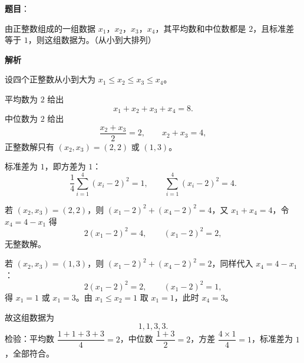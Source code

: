 \begin{answer}

\textbf{题目}：

由正整数组成的一组数据 $x_1$，$x_2$，$x_3$，$x_4$，其平均数和中位数都是 $2$，且标准差等于 $1$，则这组数据为\gkblank{}。（从小到大排列）

\textbf{解析}

设四个正整数从小到大为 $x_1\leqslant x_2\leqslant x_3\leqslant x_4$。

平均数为 $2$ 给出
\nopagebreak[4]
\[x_1+x_2+x_3+x_4=8.\]
中位数为 $2$ 给出
\nopagebreak[4]
\[\frac{x_2+x_3}{2}=2,\qquad x_2+x_3=4,\]
正整数解只有 $(x_2,x_3)=(2,2)$ 或 $(1,3)$。

标准差为 $1$，即方差为 $1$：
\nopagebreak[4]
\[\frac14\sum_{i=1}^{4}(x_i-2)^2=1,\qquad \sum_{i=1}^{4}(x_i-2)^2=4.\]

若 $(x_2,x_3)=(2,2)$，则 $(x_1-2)^2+(x_4-2)^2=4$，又 $x_1+x_4=4$，令 $x_4=4-x_1$ 得
\nopagebreak[4]
\[2(x_1-2)^2=4,\qquad (x_1-2)^2=2,\]
无整数解。

若 $(x_2,x_3)=(1,3)$，则 $(x_1-2)^2+(x_4-2)^2=2$，同样代入 $x_4=4-x_1$：
\nopagebreak[4]
\[2(x_1-2)^2=2,\qquad (x_1-2)^2=1,\]
得 $x_1=1$ 或 $x_1=3$。由 $x_1\leqslant x_2=1$ 取 $x_1=1$，此时 $x_4=3$。

故这组数据为
\nopagebreak[4]
\[1,1,3,3.\]
检验：平均数 $\dfrac{1+1+3+3}{4}=2$，中位数 $\dfrac{1+3}{2}=2$，方差 $\dfrac{4\times1}{4}=1$，标准差为 $1$，全部符合。


\end{answer}
